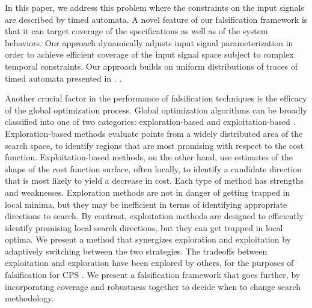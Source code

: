 In this paper, we address this problem where the constraints on the input signals are described by timed automata.
A novel feature of our falsification framework is that it can target coverage of the specifications as well as of the system behaviors.
Our approach dynamically adjusts input signal parameterization in order to achieve
efficient coverage of the input signal space subject to
complex temporal constraints. Our approach builds on uniform
distributions of traces of timed automata presented in \cite{}.
.




Another crucial factor in the performance of falsification techniques is the efficacy of the global optimization process.
Global optimization algorithms can be broadly classified into one of two
categories: exploration-based and exploitation-based \cite{Blum03}.
Exploration-based methods evaluate points from a widely distributed area 
of the search space, to identify regions that are most promising with 
respect to the cost function. Exploitation-based methods, on the other hand, 
use estimates of the shape of the cost function surface, often locally, to
identify a candidate direction that is most likely to yield a decrease
in cost.  Each type of method has strengths and weaknesses. Exploration
methods are not in danger of getting trapped in local minima, but they may 
be inefficient in terms of identifying appropriate directions to search.  By
contrast, exploitation methods are designed to efficiently identify
promising local search directions, but they can get trapped in local optima.
We present a method that synergizes exploration and 
exploitation by adaptively switching between the two strategies.
The tradeoffs between exploitation and exploration have been explored by others, 
for the purposes of falsification for CPS \cite{Ratschan14}. We present a falsification framework that goes further, by incorporating coverage and robustness together to decide when to change search methodology.

